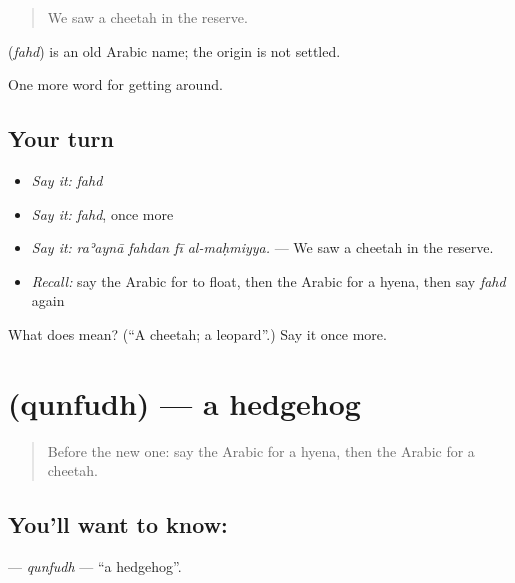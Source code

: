 \begin{quote}
We saw a cheetah in the reserve.
\end{quote}

\begin{cousinweb}
\textbf{} (\emph{fahd}) is an old Arabic name; the origin is not settled.
\end{cousinweb}

\begin{grammarlens}[title={What you've built}]
One more word for getting around.
\end{grammarlens}

\subsection*{Your turn}
\begin{itemize}
\raggedright
  \item \emph{Say it:} \emph{fahd}
  \item \emph{Say it:} \emph{fahd}, once more
  \item \emph{Say it:} \emph{raʾaynā fahdan fī al-maḥmiyya.} — We saw a cheetah in the reserve.
  \item \emph{Recall:} say the Arabic for to float, then the Arabic for a hyena, then say \emph{fahd} again
\end{itemize}

\begin{tcolorbox}[breakable,colback=teal!4,colframe=teal!35!black,title={Before you move on}]
What does  mean? (\textquotedblleft{}A cheetah; a leopard\textquotedblright{}.) Say it once more.
\end{tcolorbox}
\section[\texorpdfstring{\ar{قنفذ} (qunfudh)}{قنفذ (qunfudh)}]{ (qunfudh) — a hedgehog}

\label{lesson:AR-C475-qunfudh}



\begin{quote}
Before the new one: say the Arabic for a hyena, then the Arabic for a cheetah.
\end{quote}

\subsection*{You'll want to know: }
\textbf{} — \emph{qunfudh} — \textquotedblleft{}a hedgehog\textquotedblright{}.

